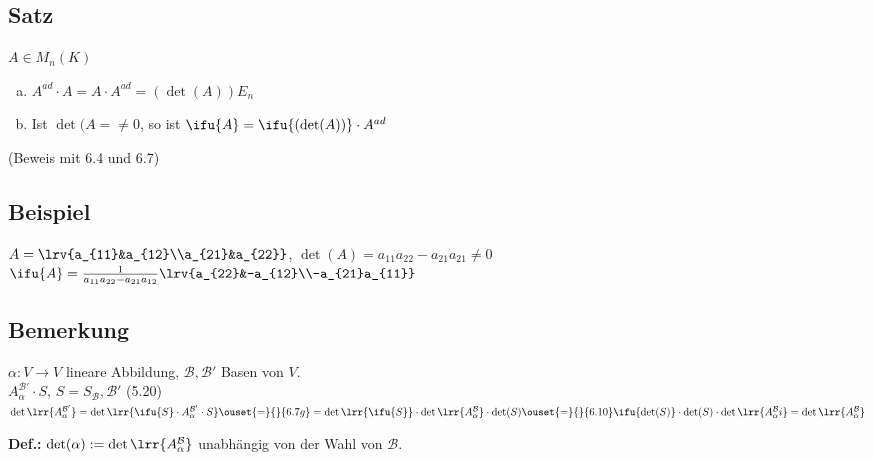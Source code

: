 \subsection{Satz}
$A\in M_n(K)$
\begin{enumerate}[a)]
  \item $A^{ad}\cdot A=A\cdot A^{ad}=(\det(A))E_n$
  \item Ist $\det(A=\neq 0$, so ist $\ifu{A}=\ifu{(\det(A))}\cdot A^{ad}$
\end{enumerate}
(Beweis mit 6.4 und 6.7)

\subsection{Beispiel}
$A=\lrv{a_{11}&a_{12}\\a_{21}&a_{22}}$, $\det(A)=a_{11}a_{22}-a_{21}a_{21}\neq 0$\\
$\ifu{A}=\frac{1}{a_{11}a_{22}-a_{21}a_{12}}\lrv{a_{22}&-a_{12}\\-a_{21}a_{11}}$

\subsection{Bemerkung}
$\alpha:V\rightarrow V$ lineare Abbildung, $\mathcal{B},\mathcal{B}'$ Basen von $V$.\\
$A_\alpha^{\mathcal{B}'}\cdot S$, $S=S_{\mathcal{B}},\mathcal{B}'$ (5.20)\\
$\det\lrr{A_\alpha^{\mathcal{B}'}}=\det\lrr{\ifu{S}\cdot A_\alpha^{\mathcal{B}'}\cdot
S}\ouset{=}{}{6.7g}=\det\lrr{\ifu{S}}\cdot\det\lrr{A_\alpha^{\mathcal{B}}}\cdot\det(S)\ouset{=}{}{6.10}\ifu{\det(S)}\cdot\det(S)\cdot\det\lrr{A_\alpha^{\mathcal{B}}i}=\det\lrr{A_\alpha^{\mathcal{B}}}$

\textbf{Def.:} $\det(\alpha):=\det\lrr{A_\alpha^{\mathcal{B}}}$ unabhängig von
der Wahl von $\mathcal{B}$.
